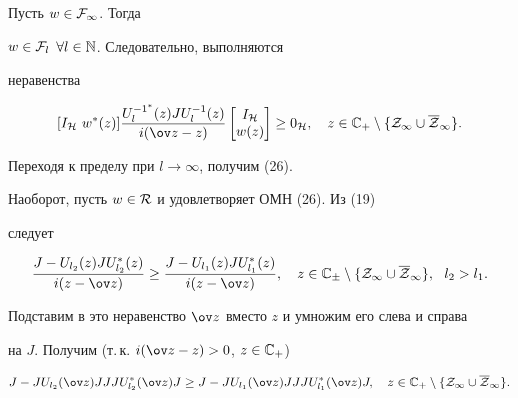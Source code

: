 \begin{pf}


Пусть $w\in {\cal F}_{\infty }$. Тогда


$w\in {\cal F}_{l}$ $\forall l\in {\Bbb N}$. Следовательно, выполняются


неравенства


\begin{equation}


[ I_{\cal H}\ w^*(z) ] \frac {U_{l}^{-1^*}(z)J


U_{l}^{-1}(z)}{i(\ov z-z)}


\begin{bmatrix} I_{\cal H} \\ w(z) \end{bmatrix}


\geq 0_{\cal H},\quad z\in {\Bbb C}_{+}


\setminus \{{\cal Z}_{\infty } \cup \overline {\cal Z}_{\infty } \}.


\end{equation}


Переходя к пределу при $l\to \infty$, получим (26).





Наоборот, пусть $w\in {\cal R}$ и удовлетворяет ОМН (26). Из (19)


следует


$$


\frac{J- U_{l_2}(z)J U_{l_2}^*(z)} {i(z-\ov z)}\geq


\frac{J-U_{l_1}(z)J U_{l_1}^*(z)}{i(z-\ov z)}, \quad


z \in {\Bbb C}_{\pm }


\setminus \{{\cal Z}_{\infty } \cup \overline {\cal Z}_{\infty } \},\ \


l_2>l_1.


$$


Подставим в это неравенство $\ov z$ вместо $z$ и умножим его слева и справа


на $J$. Получим (т.\,к. $i(\ov z -z)>0$, $z\in {\Bbb C}_+$)


$$


J- JU_{l_2}(\ov z)JJJ U_{l_2}^*(\ov z)J \geq


J-JU_{l_1}(\ov z)JJJ U_{l_1}^*(\ov z)J, \quad


z \in {\Bbb C}_{+}


\setminus \{{\cal Z}_{\infty } \cup \overline {\cal Z}_{\infty } \}.


$$



\end{pf}
